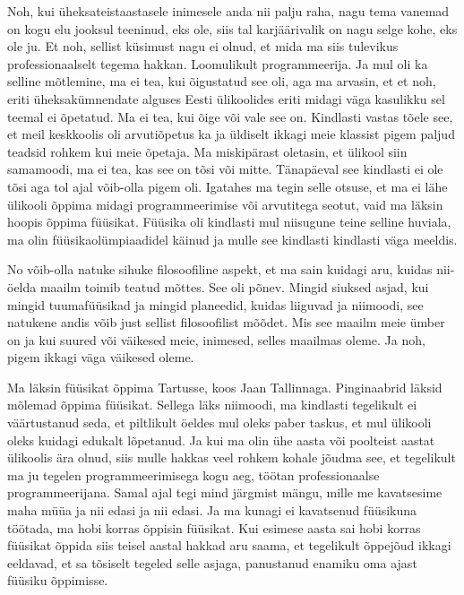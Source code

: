 
Noh, kui üheksateistaastasele inimesele anda nii palju raha, nagu tema vanemad 
on kogu elu jooksul teeninud, eks ole, siis tal karjäärivalik on nagu selge 
kohe, eks ole ju. Et noh, sellist küsimust nagu ei olnud, et mida ma siis 
tulevikus professionaalselt tegema hakkan. Loomulikult programmeerija.  Ja  mul 
oli ka selline mõtlemine, ma ei tea, kui õigustatud see oli, aga ma arvasin, et 
et noh, eriti üheksakümnendate alguses Eesti ülikoolides eriti midagi väga 
kasulikku sel teemal ei õpetatud. Ma ei tea,  kui õige või vale see on. 
Kindlasti vastas tõele see, et meil keskkoolis oli  arvutiõpetus ka ja üldiselt 
ikkagi meie klassist pigem paljud teadsid rohkem kui meie õpetaja. Ma 
miskipärast oletasin, et ülikool siin samamoodi, ma ei tea, kas see on tõsi või 
mitte. Tänapäeval see kindlasti ei ole tõsi aga  tol ajal  võib-olla pigem oli. 
Igatahes ma tegin selle otsuse, et ma ei lähe ülikooli õppima midagi 
programmeerimise või arvutitega seotut, vaid ma läksin hoopis õppima füüsikat. 
Füüsika oli kindlasti mul  niisugune teine selline huviala,  ma olin 
füüsikaolümpiaadidel käinud  ja mulle see kindlasti kindlasti väga meeldis. 


No võib-olla natuke sihuke filosoofiline aspekt, et ma sain kuidagi aru, kuidas 
nii-öelda maailm toimib teatud mõttes. See oli põnev. Mingid siuksed asjad, kui 
 mingid tuumafüüsikad ja mingid planeedid, kuidas liiguvad ja niimoodi, see 
natukene andis võib just sellist filosoofilist mõõdet. Mis see maailm meie 
ümber on ja kui suured või väikesed meie, inimesed, selles maailmas  oleme.  Ja 
noh, pigem ikkagi väga väikesed oleme. 


Ma läksin  füüsikat õppima Tartusse, koos Jaan 
Tallinnaga. Pinginaabrid läksid mõlemad õppima 
füüsikat. Sellega läks niimoodi, ma kindlasti  tegelikult ei väärtustanud seda, 
et piltlikult öeldes mul oleks paber taskus, et mul ülikooli oleks  kuidagi 
edukalt lõpetanud. Ja kui ma olin ühe aasta või poolteist aastat ülikoolis ära 
olnud, siis mulle hakkas veel rohkem kohale jõudma see, et tegelikult ma ju 
tegelen programmeerimisega kogu aeg, töötan professionaalse programmeerijana. 
Samal ajal tegi mind järgmist mängu, mille me kavatsesime maha müüa ja nii 
edasi ja nii edasi. Ja ma kunagi ei kavatsenud füüsikuna töötada, ma hobi 
korras õppisin füüsikat. Kui esimese aasta sai hobi korras  füüsikat õppida 
siis teisel aastal hakkad aru saama, et tegelikult  õppejõud ikkagi eeldavad, 
et sa tõsiselt tegeled selle asjaga, panustanud enamiku oma ajast füüsiku 
õppimisse. 

